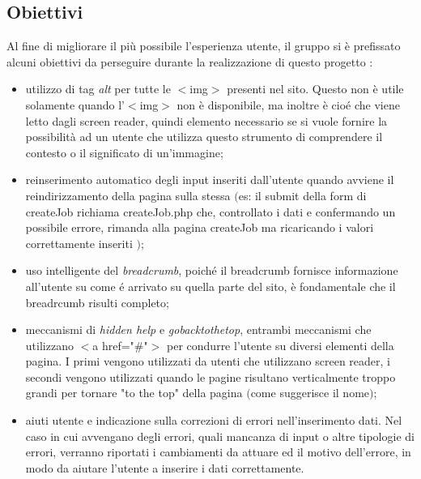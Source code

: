   \subsection{Obiettivi}
  Al fine di migliorare il più possibile l'esperienza utente, il gruppo si è prefissato alcuni obiettivi da perseguire durante la realizzazione di questo progetto :
  \begin{itemize}
    \item utilizzo di tag \textit{alt} per tutte le $<$img$>$ presenti nel sito. Questo non è utile solamente quando l'$<$img$>$ non è disponibile, ma inoltre è cioé che viene letto dagli screen reader, quindi elemento necessario se si vuole fornire la possibilità ad un utente che utilizza questo strumento di comprendere il contesto o il significato di un'immagine;
    \item reinserimento automatico degli input inseriti dall'utente quando avviene il reindirizzamento della pagina sulla stessa 
     $($es: il submit della form di createJob richiama createJob.php che, controllato i dati e confermando un possibile errore, rimanda alla pagina createJob ma ricaricando i valori correttamente inseriti $)$;
    \item uso intelligente del \textit{breadcrumb}, poiché il breadcrumb fornisce informazione all'utente su come é arrivato su quella parte del sito, è fondamentale che il breadrcumb risulti completo;
    \item meccanismi di \textit{hidden help} e \textit{gobacktothetop}, entrambi meccanismi che utilizzano $<$a href="\#"$>$ per condurre l'utente su diversi elementi della pagina. I primi vengono utilizzati da utenti che utilizzano screen reader, i secondi vengono utilizzati quando le pagine risultano verticalmente troppo grandi per tornare "to the top" della pagina $($come suggerisce il nome$)$;
    \item aiuti utente e indicazione sulla correzioni di errori nell'inserimento dati. Nel caso in cui avvengano degli errori, quali mancanza di input o altre tipologie di errori, verranno riportati i cambiamenti da attuare ed il motivo dell'errore, in modo da aiutare l'utente a inserire i dati correttamente.
  \end{itemize} 